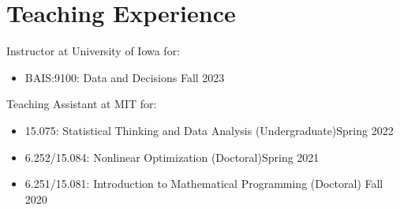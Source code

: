\documentclass[11pt]{article}
\begin{document}



\section*{\large Teaching Experience}

\noindent Instructor at University of Iowa for:

\begin{itemize}\setlength{\leftskip}{3ex}
\item  BAIS:9100:  Data and Decisions \hfill Fall 2023
\end{itemize}

\noindent Teaching Assistant at MIT for:
\begin{itemize}\setlength{\leftskip}{3ex}
\item  15.075: Statistical Thinking and Data Analysis (Undergraduate)\hfill Spring 2022
\item  6.252/15.084: Nonlinear Optimization (Doctoral)\hfill Spring 2021
\item 6.251/15.081: Introduction to Mathematical Programming (Doctoral) \hfill Fall 2020
\end{itemize}

\end{document}
